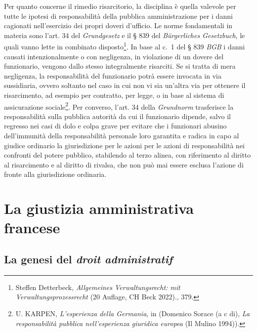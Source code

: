 \documentclass[12pt,it,a4paper,]{report}
\begin{document}
Per quanto concerne il rimedio risarcitorio, la disciplina è quella
valevole per tutte le ipotesi di responsabilità della pubblica
amministrazione per i danni cagionati nell'esercizio dei propri doveri
d'ufficio. Le norme fondamentali in materia sono l'art. 34 del
\emph{Grundgesetz} e il § 839 del \emph{Bürgerliches Gesetzbuch}, le
quali vanno lette in combinato disposto\footnote{{Steffen Detterbeck,
  \emph{Allgemeines Verwaltungsrecht: mit Verwaltungsprozessrecht} (20
  Auflage, CH Beck 2022).}, 379.}. In base al c.~1 del § 839 \emph{BGB}
i danni causati intenzionalmente o con negligenza, in violazione di un
dovere del funzionario, vengono dallo stesso integralmente risarciti. Se
si tratta di mera negligenza, la responsabilità del funzionario potrà
essere invocata in via sussidiaria, ovvero soltanto nel caso in cui non
vi sia un'altra via per ottenere il risarcimento, ad esempio per
contratto, per legge, o in base al sistema di assicurazione
sociale\footnote{U. KARPEN, \emph{L'esperienza della Germania}, in
  (Domenico Sorace (a c di), \emph{La responsabilità pubblica
  nell'esperienza giuridica europea} (Il Mulino 1994)).}. Per converso,
l'art. 34 della \emph{Grundnorm} trasferisce la responsabilità sulla
pubblica autorità da cui il funzionario dipende, salvo il regresso nei
casi di dolo e colpa grave per evitare che i funzionari abusino
dell'immunità della responsabilità personale loro garantita e radica in
capo al giudice ordinario la giurisdizione per le azioni per le azioni
di responsabilità nei confronti del potere pubblico, stabilendo al terzo
alinea, con riferimento al diritto al risarcimento e al diritto di
rivalsa, che non può mai essere esclusa l'azione di fronte alla
giurisdizione ordinaria.

\hypertarget{la-giustizia-amministrativa-francese}{%
\chapter{La giustizia amministrativa
francese}\label{la-giustizia-amministrativa-francese}}

\hypertarget{la-genesi-del-droit-administratif}{%
\section{\texorpdfstring{La genesi del \emph{droit
administratif}}{La genesi del droit administratif}}\label{la-genesi-del-droit-administratif}}
\end{document}
